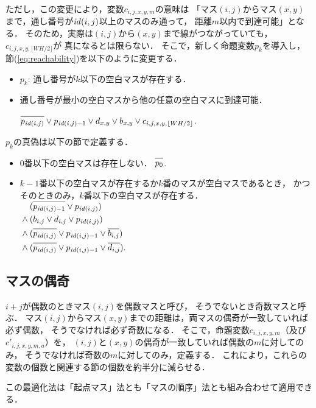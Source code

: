 \documentclass[a4j]{jarticle}
\newcommand{\N}[1]{\overline{#1\vphantom{l}}}
\newcommand{\←}{{\leftarrow}}
\newcommand{\→}{{\rightarrow}}
\newcommand{\↑}{{\uparrow}}
\newcommand{\↓}{{\downarrow}}
\begin{document}
ただし，この変更により，変数$c_{i,j,x,y,m}$の意味は
「マス$(i,j)$からマス$(x,y)$まで，通し番号が$\mathit{id}(i,j)$以上のマスのみ通って，
距離$m$以内で到達可能」となる．
そのため，実際は$(i,j)$から$(x,y)$まで線がつながっていても，
$c_{i,j,x,y,\lfloor WH/2\rfloor}$が
真になるとは限らない．
そこで，新しく命題変数$p_k$を導入し，
節(\ref{eq:reachability})を以下のように変更する．
%
\begin{itemize}
\item $p_k$: 通し番号が$k$以下の空白マスが存在する．
\item 通し番号が最小の空白マスから他の任意の空白マスに到達可能．
  \par\qquad
  $\N{p_{\id(i,j)}}\lor{p_{\id(i,j)-1}}\lor
   d_{x,y}\lor b_{x,y}\lor
   c_{i,j,x,y,\lfloor WH/2\rfloor}$.

\end{itemize}
%
$p_k$の真偽は以下の節で定義する．
\begin{itemize}
\item $0$番以下の空白マスは存在しない．
  $\N{p_0}$.
\item $k-1$番以下の空白マスが存在するか$k$番のマスが空白マスであるとき，
  かつそのときのみ，$k$番以下の空白マスが存在する．
  $\begin{aligned}[t]
   &(\N{p_{\id(i,j)-1}}\lor p_{\id(i,j)}) \\ {}\land{}
   &(b_{i,j}\lor d_{i,j}\lor p_{\id(i,j)}) \\ {}\land{}
   &(\N{p_{\id(i,j)}}\lor p_{\id(i,j)-1}\lor \N{b_{i,j}}) \\ {}\land{}
   &(\N{p_{\id(i,j)}}\lor p_{\id(i,j)-1}\lor \N{d_{i,j}}).
   \end{aligned}$
\end{itemize}

\subsection{マスの偶奇}
$i+j$が偶数のときマス$(i,j)$を偶数マスと呼び，
そうでないとき奇数マスと呼ぶ．
マス$(i,j)$からマス$(x,y)$までの距離は，両マスの偶奇が一致していれば必ず偶数，
そうでなければ必ず奇数になる．
そこで，命題変数$c_{i,j,x,y,m}$（及び$c'_{i,j,x,y,m,a}$）を，
$(i,j)$と$(x,y)$の偶奇が一致していれば偶数の$m$に対してのみ，
そうでなければ奇数の$m$に対してのみ，定義する．
これにより，これらの変数の個数と関連する節の個数を約半分に減らせる．

この最適化法は「起点マス」法とも「マスの順序」法とも組み合わせて適用できる．
\end{document}
